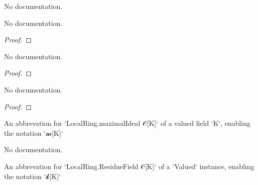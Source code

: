 \begin{theorem}\label{Valued.integerAlgebraMap.monotone}
                No documentation.
    \end{theorem}

\begin{theorem}\label{Valued.integer_val_coe}
        \leanok
                No documentation.
    \end{theorem}

\begin{proof}
    \leanok
\end{proof}

\begin{theorem}\label{Valued.valuationSubring_val_coe}
        \leanok
                No documentation.
    \end{theorem}

\begin{proof}
    \leanok
\end{proof}

\begin{theorem}\label{Valued.integer_val_le_one}
        \leanok
                No documentation.
    \end{theorem}

\begin{proof}
    \leanok
\end{proof}

\begin{definition}\label{Valued.maximalIdeal}
        \leanok
                An abbrevation for `LocalRing.maximalIdeal 𝒪[K]` of a valued field `K`, enabling the notation `𝓂[K]`
    \end{definition}

\begin{theorem}\label{Valued.maximalIdeal_eq}
                No documentation.
    \end{theorem}

\begin{definition}\label{Valued.ResidueField}
        \leanok
                An abbrevation for `LocalRing.ResidueField 𝒪[K]` of a `Valued` instance, enabling the notation `𝓀[K]`
    \end{definition}

